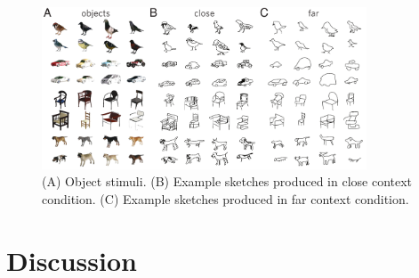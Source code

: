 \documentclass[9pt,twocolumn,twoside]{pnas-new}
\begin{document}

\begin{figure}[htbp]
\centering
\includegraphics[width=0.86\textwidth]{figures/2_sketch_gallery-min.pdf}
\caption{(A) Object stimuli. (B) Example sketches produced in close context condition. (C) Example sketches produced in far context condition.}
\label{sketch_gallery}
\end{figure}


\section*{Discussion}
\end{document}

